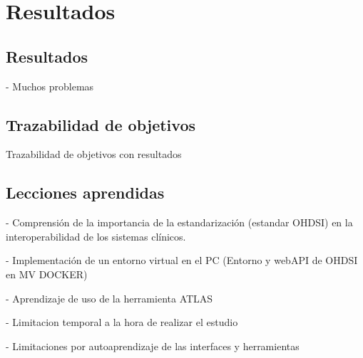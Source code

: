 \chapter{Resultados}\label{cap:10resultados}

\section{Resultados}

- Muchos problemas

\section{Trazabilidad de objetivos}

Trazabilidad de objetivos con resultados

\section{Lecciones aprendidas}

- Comprensión de la importancia de la estandarización (estandar OHDSI) en la interoperabilidad de los sistemas clínicos.

- Implementación de un entorno virtual en el PC (Entorno y webAPI de OHDSI en MV DOCKER)

- Aprendizaje de uso de la herramienta ATLAS

- Limitacion temporal a la hora de realizar el estudio

- Limitaciones por autoaprendizaje de las interfaces y herramientas